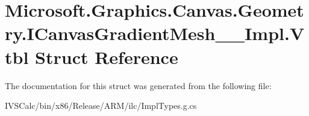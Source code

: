\hypertarget{struct_microsoft_1_1_graphics_1_1_canvas_1_1_geometry_1_1_i_canvas_gradient_mesh_____impl_1_1_vtbl}{}\section{Microsoft.\+Graphics.\+Canvas.\+Geometry.\+I\+Canvas\+Gradient\+Mesh\+\_\+\+\_\+\+Impl.\+Vtbl Struct Reference}
\label{struct_microsoft_1_1_graphics_1_1_canvas_1_1_geometry_1_1_i_canvas_gradient_mesh_____impl_1_1_vtbl}


The documentation for this struct was generated from the following file\+:\begin{DoxyCompactItemize}
\item 
I\+V\+S\+Calc/bin/x86/\+Release/\+A\+R\+M/ilc/Impl\+Types.\+g.\+cs\end{DoxyCompactItemize}
